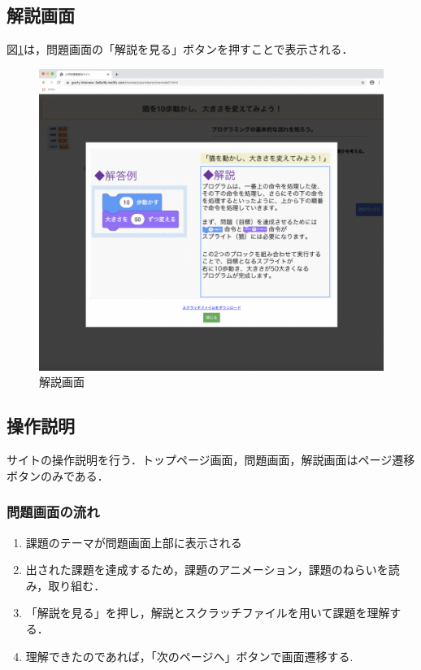 \subsection{解説画面}
図\ref{fig:zyunnbannkaisetu}は，問題画面の「解説を見る」ボタンを押すことで表示される．
\begin{figure}[h]
\begin{center}
\includegraphics[width=15cm]{zyunnbannkotae.pdf}
\caption{解説画面}
\label{fig:zyunnbannkaisetu}
\end{center}
\end{figure}

\newpage


\subsection{操作説明}
サイトの操作説明を行う．トップページ画面，問題画面，解説画面はページ遷移ボタンのみである．
\subsubsection{問題画面の流れ}
\begin{enumerate}
 \item 課題のテーマが問題画面上部に表示される
 \item 出された課題を達成するため，課題のアニメーション，課題のねらいを読み，取り組む．
 \item 「解説を見る」を押し，解説とスクラッチファイルを用いて課題を理解する．
 \item 理解できたのであれば，「次のページへ」ボタンで画面遷移する. 
\end{enumerate}

















